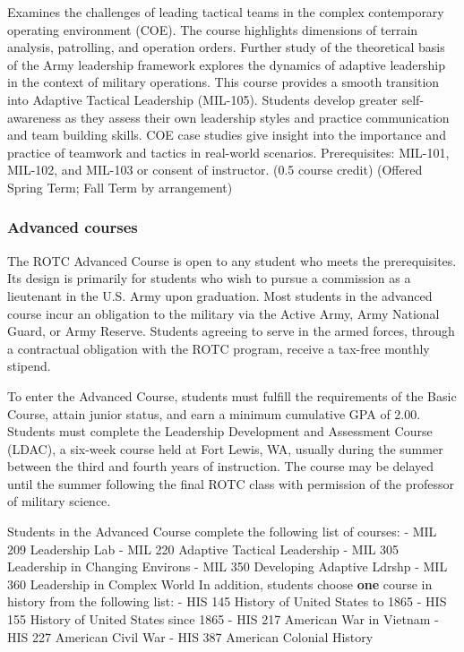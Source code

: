 \documentclass[
  letterpaper,
]{scrbook}
\begin{document}
\begin{itemize}
  Examines the challenges of leading tactical teams in the complex
  contemporary operating environment (COE). The course highlights
  dimensions of terrain analysis, patrolling, and operation orders.
  Further study of the theoretical basis of the Army leadership
  framework explores the dynamics of adaptive leadership in the context
  of military operations. This course provides a smooth transition into
  Adaptive Tactical Leadership (MIL-105). Students develop greater
  self-awareness as they assess their own leadership styles and practice
  communication and team building skills. COE case studies give insight
  into the importance and practice of teamwork and tactics in real-world
  scenarios. Prerequisites: MIL-101, MIL-102, and MIL-103 or consent of
  instructor. (0.5 course credit) (Offered Spring Term; Fall Term by
  arrangement)
\end{itemize}

\hypertarget{advanced-courses}{%
\subsubsection*{Advanced courses}\label{advanced-courses}}

The ROTC Advanced Course is open to any student who meets the
prerequisites. Its design is primarily for students who wish to pursue a
commission as a lieutenant in the U.S. Army upon graduation. Most
students in the advanced course incur an obligation to the military via
the Active Army, Army National Guard, or Army Reserve. Students agreeing
to serve in the armed forces, through a contractual obligation with the
ROTC program, receive a tax-free monthly stipend.

To enter the Advanced Course, students must fulfill the requirements of
the Basic Course, attain junior status, and earn a minimum cumulative
GPA of 2.00. Students must complete the Leadership Development and
Assessment Course (LDAC), a six-week course held at Fort Lewis, WA,
usually during the summer between the third and fourth years of
instruction. The course may be delayed until the summer following the
final ROTC class with permission of the professor of military science.

Students in the Advanced Course complete the following list of courses:
- MIL 209 Leadership Lab - MIL 220 Adaptive Tactical Leadership - MIL
305 Leadership in Changing Environs - MIL 350 Developing Adaptive Ldrshp
- MIL 360 Leadership in Complex World In addition, students choose
\textbf{one} course in history from the following list: - HIS 145
History of United States to 1865 - HIS 155 History of United States
since 1865 - HIS 217 American War in Vietnam - HIS 227 American Civil
War - HIS 387 American Colonial History
\end{document}
